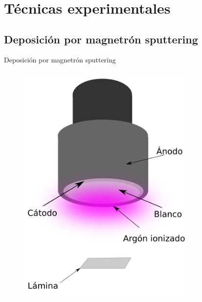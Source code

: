 \documentclass[11pt]{beamer}
\begin{document}
\section{Técnicas experimentales}

	\subsection{Deposición por magnetrón sputtering}
		\begin{frame}{Deposición por magnetrón sputtering}
			\begin{columns}[T]
				\begin{column}{.4\textwidth}
					\begin{figure}[H]
					\centering
					\includegraphics[scale=0.25]{img/SchemaDeposition.png}
					\end{figure}
				\end{column}
				\begin{column}{.58\textwidth}
					\begin{figure}[H]

\end{figure}
\end{column}
\end{columns}
\end{frame}
\end{document}
